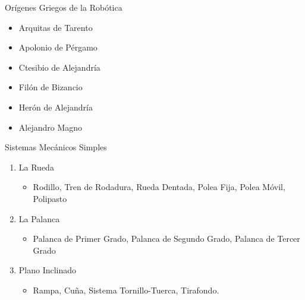 
\begin{frame}[fragile]{Orígenes Griegos de la Robótica}
\vspace{8px}
\pause
{}
\begin{block}{}
	\begin{itemize}
		\item Arquitas de Tarento
		\pause
		\item Apolonio de Pérgamo
		\pause
		\item Ctesibio de Alejandría
		\pause
		\item Filón de Bizancio
		\pause
		\item Herón de Alejandría
		\pause
		\item Alejandro Magno
	\end{itemize}
\end{block}
\end{frame}


\begin{frame}[fragile]{Sistemas Mecánicos Simples}
\vspace{8px}
\pause
{}
\begin{block}{}
	\begin{enumerate}
		\item La Rueda
		\pause
			\begin{itemize}
				\item Rodillo, Tren de Rodadura, Rueda Dentada, Polea Fija, Polea Móvil, Polipasto
				\pause
			\end{itemize}
		\item La Palanca
		\pause
			\begin{itemize}
				\item Palanca de Primer Grado, Palanca de Segundo Grado, Palanca de Tercer Grado
				\pause
			\end{itemize}
		\item Plano Inclinado
		\pause
			\begin{itemize}
				\item Rampa, Cuña, Sistema Tornillo-Tuerca, Tirafondo.
			\end{itemize}
	\end{enumerate}
\end{block}
\end{frame}

